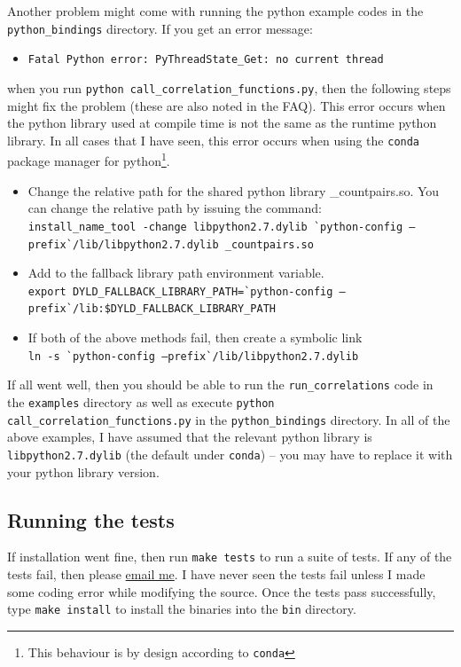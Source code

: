 \documentclass[12pt,titlepage]{article}
\begin{document}
Another problem might come with running the python example codes in the \texttt{python\_bindings} directory. If you get an error message:
\begin{itemize} 
\item \texttt{Fatal Python error: PyThreadState\_Get: no current thread} 
\end{itemize}
when you run \texttt{python call\_correlation\_functions.py}, then the following 
steps might fix the problem (these are also noted in the FAQ). This error occurs when the python library used at compile time is not the same 
as the runtime python library. In all cases that I have seen, this error occurs when using the \texttt{conda} package manager for python\footnote{This 
behaviour is by design according to \texttt{conda}}. 
\begin{itemize}

\item Change the relative path for the shared python library \_countpairs.so. You can change the relative path by issuing the command: \\
{\scriptsize\texttt{install\_name\_tool -change libpython2.7.dylib  \`{}python-config --prefix\`{}/lib/libpython2.7.dylib \_countpairs.so}}

\item Add to the fallback library path environment variable. \\
{\scriptsize\texttt{export DYLD\_FALLBACK\_LIBRARY\_PATH=\`{}python-config --prefix\`{}/lib:\$DYLD\_FALLBACK\_LIBRARY\_PATH}}

\item If both of the above methods fail, then create a symbolic link \\
{\scriptsize\texttt{ln -s \`{}python-config --prefix\`{}/lib/libpython2.7.dylib}}
\end{itemize}
If all went well, then you should be able to run the \texttt{run\_correlations} code in the \texttt{examples} directory as well as execute \texttt{python call\_correlation\_functions.py} 
in the \texttt{python\_bindings} directory. In all of the above examples, I have assumed that the relevant python library is \texttt{libpython2.7.dylib} (the default 
under \texttt{conda}) -- you may have to replace it with your python library version.

\subsection{Running the tests}
If installation went fine, then run \texttt{make tests} to run a suite of tests. If any of the tests fail, then please \href{mailto:manodeep@gmail.com}{email me}. I have 
never seen the tests fail unless I made some coding error while modifying the source. 
Once the tests pass successfully, type \texttt{make install} to install the binaries into the \texttt{bin} directory. 
\end{document}
